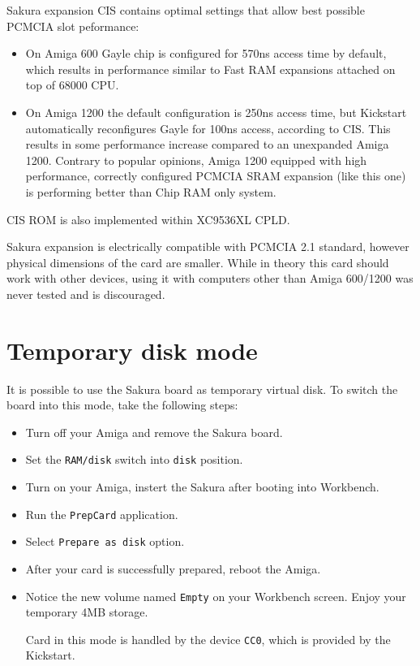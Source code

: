 \documentclass[10pt,a4paper]{article}
\begin{document}
Sakura expansion CIS contains optimal settings that allow best possible PCMCIA slot peformance:
\begin{itemize}
	\item On Amiga 600 Gayle chip is configured for 570ns access time by default, which results in performance similar to Fast RAM expansions attached on top of 68000 CPU.
	\item On Amiga 1200 the default configuration is 250ns access time, but Kickstart automatically reconfigures Gayle for 100ns access, according to CIS. This results in some performance increase compared to an unexpanded Amiga 1200. Contrary to popular opinions, Amiga 1200 equipped with high performance, correctly configured PCMCIA SRAM expansion (like this one) is performing better than Chip RAM only system.
\end{itemize}

CIS ROM is also implemented within XC9536XL CPLD.

Sakura expansion is electrically compatible with PCMCIA 2.1 standard, however physical dimensions of the card are smaller. While in theory this card should work with other devices, using it with computers other than Amiga 600/1200 was never tested and is discouraged.

\section*{Temporary disk mode}

It is possible to use the Sakura board as temporary virtual disk. To switch the board into this mode, take the following steps:
\begin{itemize}
	\item Turn off your Amiga and remove the Sakura board.
	\item Set the {\tt RAM/disk} switch into {\tt disk} position.
	\item Turn on your Amiga, instert the Sakura after booting into Workbench.
	\item Run the {\tt PrepCard} application.
	\item Select {\tt Prepare as disk} option.
	\item After your card is successfully prepared, reboot the Amiga.
	\item Notice the new volume named {\tt Empty} on your Workbench screen. Enjoy your temporary 4MB storage.

Card in this mode is handled by the device {\tt CC0}, which is provided by the Kickstart.
\end{itemize}
\end{document}
